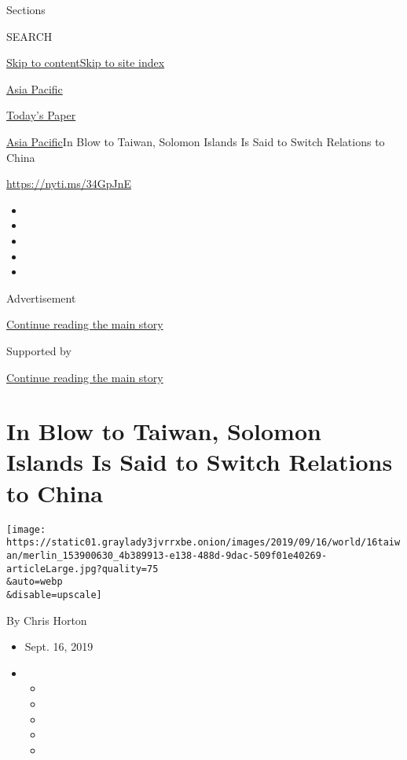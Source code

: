 Sections

SEARCH

\protect\hyperlink{site-content}{Skip to
content}\protect\hyperlink{site-index}{Skip to site index}

\href{https://www.nytimes3xbfgragh.onion/section/world/asia}{Asia
Pacific}

\href{https://myaccount.nytimes3xbfgragh.onion/auth/login?response_type=cookie\&client_id=vi}{}

\href{https://www.nytimes3xbfgragh.onion/section/todayspaper}{Today's
Paper}

\href{/section/world/asia}{Asia Pacific}\textbar{}In Blow to Taiwan,
Solomon Islands Is Said to Switch Relations to China

\href{https://nyti.ms/34GpJnE}{https://nyti.ms/34GpJnE}

\begin{itemize}
\item
\item
\item
\item
\item
\end{itemize}

Advertisement

\protect\hyperlink{after-top}{Continue reading the main story}

Supported by

\protect\hyperlink{after-sponsor}{Continue reading the main story}

\hypertarget{in-blow-to-taiwan-solomon-islands-is-said-to-switch-relations-to-china}{%
\section{In Blow to Taiwan, Solomon Islands Is Said to Switch Relations
to
China}\label{in-blow-to-taiwan-solomon-islands-is-said-to-switch-relations-to-china}}

\texttt{[image: https://static01.graylady3jvrrxbe.onion/images/2019/09/16/world/16taiwan/merlin\_153900630\_4b389913-e138-488d-9dac-509f01e40269-articleLarge.jpg?quality=75\\\&auto=webp\\\&disable=upscale]}

By Chris Horton

\begin{itemize}
\item
  Sept. 16, 2019
\item
  \begin{itemize}
  \item
  \item
  \item
  \item
  \item
  \end{itemize}
\end{itemize}

